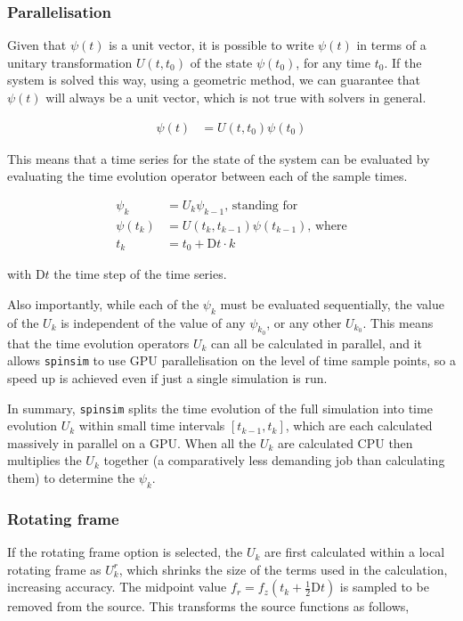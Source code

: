 \documentclass{jors}
\begin{document}
		\subsubsection*{Parallelisation}
			Given that \(\psi(t)\) is a unit vector, it is possible to write \(\psi(t)\) in terms of a unitary transformation \(U(t, t_0)\) of the state \(\psi(t_0)\), for any time \(t_0\). If the system is solved this way, using a geometric method, we can guarantee that \(\psi(t)\) will always be a unit vector, which is not true with solvers in general.
			
			\begin{align*}
				\psi(t) &= U(t, t_0)\psi(t_0)
			\end{align*}
			
			This means that a time series for the state of the system can be evaluated by evaluating the time evolution operator between each of the sample times.
			
			\begin{align*}
				\psi_k &= U_k\psi_{k-1}\textrm{, standing for}\\
				\psi(t_{k}) &= U(t_{k}, t_{k-1})\psi(t_{k-1})\textrm{, where}\\
				t_k &= t_0 + \mathrm{D}t\cdot k
			\end{align*}
			
			with \(\mathrm{D}t\) the time step of the time series.

			Also importantly, while each of the \(\psi_k\) must be evaluated sequentially, the value of the \(U_k\) is independent of the value of any \(\psi_{k_0}\), or any other \(U_{k_0}\). This means that the time evolution operators \(U_k\) can all be calculated in parallel, and it allows \texttt{spinsim} to use GPU parallelisation on the level of time sample points, so a speed up is achieved even if just a single simulation is run.

			In summary, \texttt{spinsim} splits the time evolution of the full simulation into time evolution \(U_k\) within small time intervals \([t_{k - 1}, t_{k}]\), which are each calculated massively in parallel on a GPU. When all the \(U_k\) are calculated CPU then multiplies the \(U_k\) together (a comparatively less demanding job than calculating them) to determine the \(\psi_k\).

		\subsubsection*{Rotating frame}
			If the rotating frame option is selected, the \(U_k\) are first calculated within a local rotating frame as \(U^r_k\), which shrinks the size of the terms used in the calculation, increasing accuracy. The midpoint value \(f_r = f_z(t_k + \frac12\mathrm{D}t)\) is sampled to be removed from the source. This transforms the source functions as follows,
			
\end{document}
